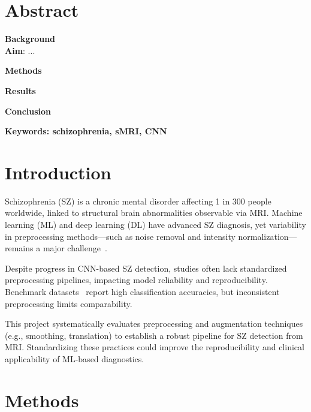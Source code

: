 



\maketitle

\section{Abstract}

\textbf{Background}\\
\lipsum[1]
\textbf{Aim}: ...

\textbf{Methods}\\
\lipsum[1]

\textbf{Results}\\
\lipsum[1]

\textbf{Conclusion}\\
\lipsum[1]

\textbf{Keywords: schizophrenia, sMRI, CNN}

\section{Introduction}

Schizophrenia (SZ) is a chronic mental disorder affecting 1 in 300 people worldwide, linked to structural brain abnormalities observable via MRI. Machine learning (ML) and deep learning (DL) have advanced SZ diagnosis, yet variability in preprocessing methods—such as noise removal and intensity normalization—remains a major challenge~\cite{Benli2023, Zhang2022}.

Despite progress in CNN-based SZ detection, studies often lack standardized preprocessing pipelines, impacting model reliability and reproducibility. Benchmark datasets~\cite{Oh2020, Verma2023} report high classification accuracies, but inconsistent preprocessing limits comparability.

This project systematically evaluates preprocessing and augmentation techniques (e.g., smoothing, translation) to establish a robust pipeline for SZ detection from MRI. Standardizing these practices could improve the reproducibility and clinical applicability of ML-based diagnostics.

\section{Methods}

